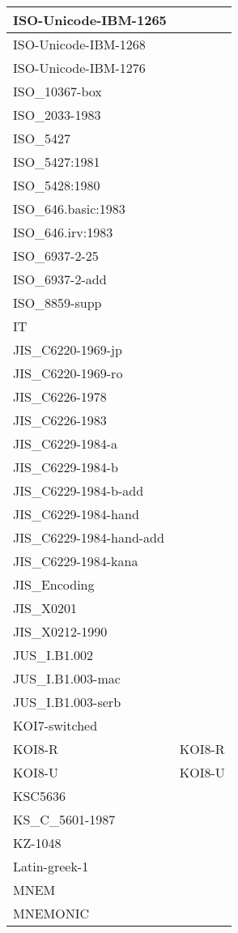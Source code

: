 \documentclass{wg21}
\begin{document}
\begin{longtable}{| p{} | p{} |}
ISO-Unicode-IBM-1265 & \\ \hline
ISO-Unicode-IBM-1268 & \\ \hline
ISO-Unicode-IBM-1276 & \\ \hline
ISO_10367-box & \\ \hline
ISO_2033-1983 & \\ \hline
ISO_5427 & \\ \hline
ISO_5427:1981 & \\ \hline
ISO_5428:1980 & \\ \hline
ISO_646.basic:1983 & \\ \hline
ISO_646.irv:1983 & \\ \hline
ISO_6937-2-25 & \\ \hline
ISO_6937-2-add & \\ \hline
ISO_8859-supp & \\ \hline
IT & \\ \hline
JIS_C6220-1969-jp & \\ \hline
JIS_C6220-1969-ro & \\ \hline
JIS_C6226-1978 & \\ \hline
JIS_C6226-1983 & \\ \hline
JIS_C6229-1984-a & \\ \hline
JIS_C6229-1984-b & \\ \hline
JIS_C6229-1984-b-add & \\ \hline
JIS_C6229-1984-hand & \\ \hline
JIS_C6229-1984-hand-add & \\ \hline
JIS_C6229-1984-kana & \\ \hline
JIS_Encoding & \\ \hline
JIS_X0201 & \\ \hline
JIS_X0212-1990 & \\ \hline
JUS_I.B1.002 & \\ \hline
JUS_I.B1.003-mac & \\ \hline
JUS_I.B1.003-serb & \\ \hline
KOI7-switched & \\ \hline
KOI8-R & KOI8-R\\ \hline
KOI8-U & KOI8-U\\ \hline
KSC5636 & \\ \hline
KS_C_5601-1987 & \\ \hline
KZ-1048 & \\ \hline
Latin-greek-1 & \\ \hline
MNEM & \\ \hline
MNEMONIC & \\ \hline

\end{longtable}
\end{document}
